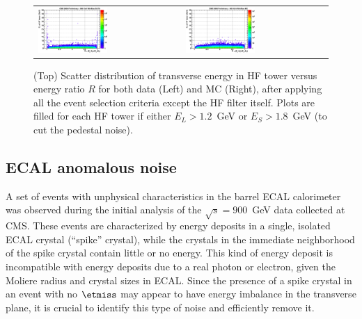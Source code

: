 \begin{itemize}
%
%
\begin{figure}[h!]
 \centering
 \begin{tabular}{ll}
  \includegraphics[width=0.5\textwidth]{plots_hcalnoise/hf_towerET_vs_ratio_DATA.eps} &
  \includegraphics[width=0.5\textwidth]{plots_hcalnoise/hf_towerET_vs_ratio_MC.eps} \\
 \end{tabular}
\caption{\small (Top) Scatter distribution of transverse energy in HF tower versus energy ratio $R$ for both data 
(Left) and MC (Right), after applying all the event selection criteria except the HF filter itself. 
Plots are filled for each HF tower if either $E_L>1.2$~GeV or $E_S>1.8$~GeV (to cut the pedestal noise).
\label{fig:hf_noise_ET_vs_R}}
\end{figure}
%
%
\end{itemize}

\subsection{ECAL anomalous noise} \label{sec:ECALNoise}

A set of events with unphysical characteristics in the barrel ECAL
calorimeter was observed during the initial analysis of the
$\sqrt{s}=900$~GeV data collected at CMS. These events are characterized
by energy deposits in a single, isolated ECAL crystal (``spike''
crystal), while the crystals in the immediate neighborhood of the spike
crystal contain little or no energy. This kind of energy deposit is
incompatible with energy deposits due to a real photon or electron,
given the Moliere radius and crystal sizes in ECAL. Since the presence
of a spike crystal in an event with no $\etmiss$ may appear to have
energy imbalance in the transverse plane, it is crucial to identify this
type of noise and efficiently remove it.

